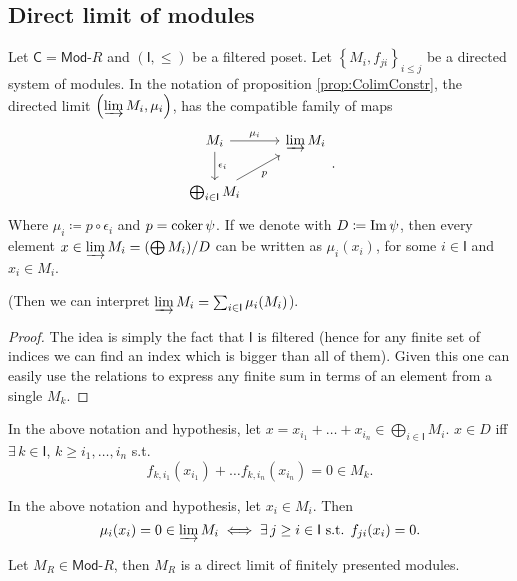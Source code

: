 \subsection{Direct limit of modules}
\begin{lem}
	Let $\mathsf{C} = \mathsf{Mod}\text{-}R$ and $\left(\mathsf{I}, \leq\right)$ be a filtered poset.
	Let $\left\{ M_i, f_{ji} \right\}_{i \leq j}$ be a directed system of modules.
	In the notation of proposition \ref{prop:ColimConstr}, the directed limit $\left(\varinjlim M_i, \mu_i\right)$, has the
	compatible family of maps
	\begin{equation}
	\begin{tikzcd}
		M_i \arrow[r, "\mu_i", rightarrow] \arrow[d, "\epsilon_i", rightarrow] &
		\varinjlim M_i \\
		\bigoplus_{i \in \mathsf{I}} M_i \arrow[ru, "p"', rightarrow] &
	\end{tikzcd}
	.\end{equation} 
	Where $\mu_i \coloneqq p \circ\epsilon_i$ and $p = \operatorname{coker} \psi$.
	If we denote with $D \coloneqq \operatorname{Im} \psi$, then
	every element $x \in \varinjlim M_i = (\bigoplus M_i)/D$ can be written as
	$\mu_i(x_i)$, for some $i \in \mathsf{I}$ and $x_i \in M_i$.

	(Then we can interpret $\varinjlim M_i = \sum_{i \in \mathsf{I}}^{} \mu_i (M_i)$).
\end{lem} 
\begin{proof}
	The idea is simply the fact that $\mathsf{I}$ is filtered 
	(hence for any finite set of indices we can find an index which is bigger than all of them).
	Given this one can easily use the relations to express any finite sum in terms of an element from a single $M_k$.
\end{proof}

\begin{lem}
	In the above notation and hypothesis, let $x = x_{i_1} + \ldots + x_{i_n} \in \bigoplus_{i \in \mathsf{I}} M_i$.
	$x \in D$ iff $\exists\, k \in \mathsf{I}$, $k \geq i_1, \ldots, i_n$ s.t.
	\begin{equation}
		f_{k, i_1}(x_{i_1}) + \ldots f_{k, i_n}(x_{i_n}) = 0 \in M_k
	.\end{equation} 
\end{lem} 

\begin{lem}
	In the above notation and hypothesis, let $x_i \in M_i$.
	Then 
	\begin{equation}
		\mu_i(x_i) = 0 \in \varinjlim M_i \iff \exists\, j \geq i \in \mathsf{I} \text{ s.t. } f_{ji}(x_i) = 0
	.\end{equation} 
\end{lem} 

\begin{prop}
	Let $M_R \in \mathsf{Mod}\text{-}R$, then $M_R$ is a direct limit of finitely presented modules.
\end{prop} 
